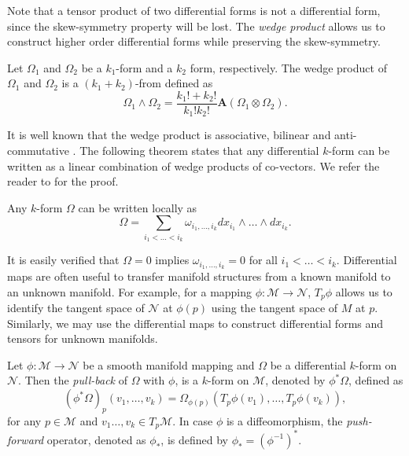 Note that a tensor product of two differential forms is not a differential form, since the skew-symmetry property will be lost. The \emph{wedge product} allows us to construct higher order differential forms while preserving the skew-symmetry. 
\begin{definition}
Let $\Omega_1$ and $\Omega_2$ be a $k_1$-form and a $k_2$ form, respectively. The wedge product of $\Omega_1$ and $\Omega_2$ is a $(k_1+k_2)$-from defined as
\begin{equation} \label{eq:2.8}
	\Omega_1 \wedge \Omega_2 = \frac{k_1! + k_2!}{k_1!k_2!} \mathbf{A}(\Omega_1\otimes \Omega_2).
\end{equation}
\end{definition}
It is well known that the wedge product is associative, bilinear and anti-commutative \cite{marsden2013introduction}. The following theorem states that any differential $k$-form can be written as a linear combination of wedge products of co-vectors. We refer the reader to \cite{abraham1978foundations} for the proof.
\begin{theorem} \label{theorem:2.2}
Any $k$-form $\Omega$ can be written locally as
\begin{equation} \label{eq:2.9}
	\Omega = \sum_{i_1<\dots<i_k} \omega_{i_1,\dots,i_k} dx_{i_1}\wedge\dots\wedge dx_{i_k}.
\end{equation}
\end{theorem}

It is easily verified that $\Omega = 0$ implies $\omega_{i_1,\dots,i_k} = 0$ for all $i_1<\dots<i_k$. Differential maps are often useful to transfer manifold structures from a known manifold to an unknown manifold. For example, for a mapping $\phi:\mathcal M \to \mathcal N$, $T_p\phi$ allows us to identify the tangent space of $\mathcal N$ at $\phi(p)$ using the tangent space of $M$ at $p$. Similarly, we may use the differential maps to construct differential forms and tensors for unknown manifolds. 

\begin{definition}
Let $\phi:\mathcal M \to \mathcal N$ be a smooth manifold mapping and $\Omega$ be a differential $k$-form on $\mathcal N$. Then the \emph{pull-back} of $\Omega$ with $\phi$, is a $k$-form on $\mathcal M$, denoted by $\phi^*\Omega$, defined as
\[
	(\phi^*\Omega)_p(v_1,\dots,v_k) = \Omega_{\phi(p)}( T_p\phi(v_1) , \dots , T_p\phi(v_k) ),
\]
for any $p\in \mathcal M$ and $v_1\dots,v_k \in T_p \mathcal M$. In case $\phi$ is a diffeomorphism, the \emph{push-forward} operator, denoted as $\phi_*$, is defined by $\phi_* = (\phi^{-1})^*$.
\end{definition}

